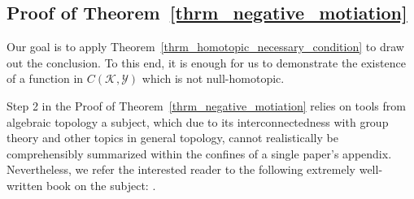 \documentclass[anon,12pt]{colt2021} %
\newcommand{\yyy}{\mathcal{Y}}
\newcommand{\kkk}{{\mathscr{K}}}
\begin{document}
\subsection{{Proof of Theorem~\ref{thrm_negative_motiation}}}\label{ss_Appendix_proof_negative_motivation_result}
Our goal is to apply Theorem~\ref{thrm_homotopic_necessary_condition} to draw out the conclusion.  To this end, it is enough for us to demonstrate the existence of a function in $C(\kkk,\yyy)$ which is not null-homotopic.  

Step 2 in the Proof of Theorem~\ref{thrm_negative_motiation} relies on tools from algebraic topology a subject, which due to its interconnectedness with group theory and other topics in general topology, cannot realistically be comprehensibly summarized within the confines of a single paper's appendix.  Nevertheless, we refer the interested reader to the following extremely well-written book on the subject: \cite{HatcherAlgebraicTopology}.  
\end{document}
